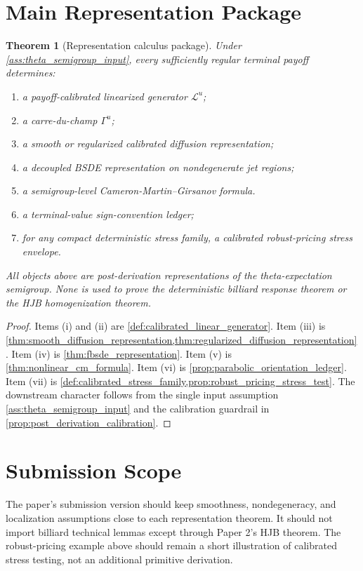 \documentclass[11pt]{amsart}
\newtheorem{theorem}{Theorem}[section]
\theoremstyle{definition}
\theoremstyle{remark}
\newcommand{\Lcal}{\mathcal L}
\begin{document}
\section{Main Representation Package}

\begin{theorem}[Representation calculus package]
\label{thm:representation_package}
Under \cref{ass:theta_semigroup_input}, every sufficiently regular terminal
payoff determines:
\begin{enumerate}[label=\textup{(\roman*)},wide,labelindent=0pt]
  \item a payoff-calibrated linearized generator $\Lcal^u$;
  \item a carre-du-champ $\Gamma^u$;
  \item a smooth or regularized calibrated diffusion representation;
  \item a decoupled BSDE representation on nondegenerate jet regions;
  \item a semigroup-level Cameron-Martin--Girsanov formula.
  \item a terminal-value sign-convention ledger;
  \item for any compact deterministic stress family, a calibrated
  robust-pricing stress envelope.
\end{enumerate}
All objects above are post-derivation representations of the theta-expectation
semigroup.  None is used to prove the deterministic billiard response theorem
or the HJB homogenization theorem.
\end{theorem}

\begin{proof}
Items (i) and (ii) are \cref{def:calibrated_linear_generator}.  Item (iii) is
\cref{thm:smooth_diffusion_representation,thm:regularized_diffusion_representation}.
Item (iv) is \cref{thm:fbsde_representation}.  Item (v) is
\cref{thm:nonlinear_cm_formula}.  Item (vi) is
\cref{prop:parabolic_orientation_ledger}.  Item (vii) is
\cref{def:calibrated_stress_family,prop:robust_pricing_stress_test}.  The
downstream character follows from the single input assumption
\cref{ass:theta_semigroup_input} and the calibration guardrail in
\cref{prop:post_derivation_calibration}.
\end{proof}

\section{Submission Scope}

The paper's submission version should keep smoothness, nondegeneracy, and
localization assumptions close to each representation theorem.  It should not
import billiard technical lemmas except through Paper 2's HJB theorem.  The
robust-pricing example above should remain a short illustration of calibrated
stress testing, not an additional primitive derivation.



\end{document}
